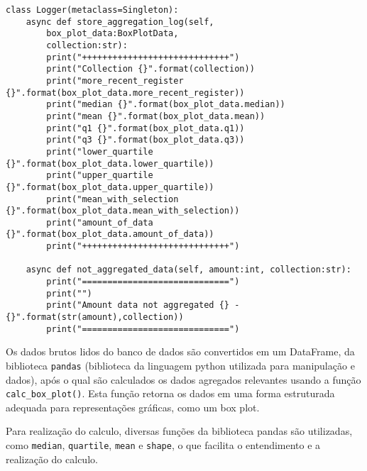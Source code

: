 \begin{verbatim}
class Logger(metaclass=Singleton):
    async def store_aggregation_log(self,
        box_plot_data:BoxPlotData,
        collection:str):
        print("+++++++++++++++++++++++++++++")
        print("Collection {}".format(collection))
        print("more_recent_register {}".format(box_plot_data.more_recent_register))
        print("median {}".format(box_plot_data.median))
        print("mean {}".format(box_plot_data.mean))
        print("q1 {}".format(box_plot_data.q1))
        print("q3 {}".format(box_plot_data.q3))
        print("lower_quartile {}".format(box_plot_data.lower_quartile))
        print("upper_quartile {}".format(box_plot_data.upper_quartile))
        print("mean_with_selection {}".format(box_plot_data.mean_with_selection))
        print("amount_of_data {}".format(box_plot_data.amount_of_data))
        print("+++++++++++++++++++++++++++++")

    async def not_aggregated_data(self, amount:int, collection:str):
        print("=============================")
        print("")
        print("Amount data not aggregated {} - {}".format(str(amount),collection))
        print("=============================")
\end{verbatim}

Os dados brutos lidos do banco de dados são convertidos em um DataFrame, da biblioteca \texttt{pandas} \cite{pandasDocs} (biblioteca da linguagem python utilizada para manipulação e dados), após o qual são calculados os dados agregados relevantes usando a função \texttt{calc\_box\_plot()}. Esta função retorna os dados em uma forma estruturada adequada para representações gráficas, como um box plot.

Para realização do calculo, diversas funções da biblioteca pandas são utilizadas, como \texttt{median}, \texttt{quartile}, \texttt{mean} e \texttt{shape}, o que facilita o entendimento e a realização do calculo. 

